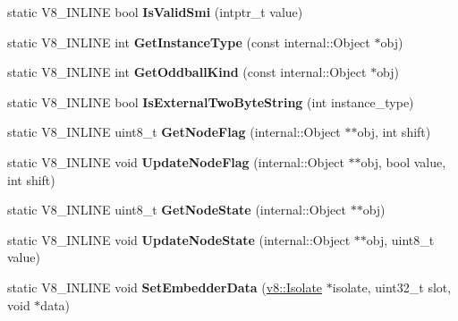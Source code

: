 \begin{DoxyCompactItemize}
static V8\+\_\+\+I\+N\+L\+I\+NE bool {\bfseries Is\+Valid\+Smi} (intptr\+\_\+t value)
\item 
\mbox{\label{classv8_1_1internal_1_1Internals_a38c4f83c21a6e6620b515e569900afaa}} 
static V8\+\_\+\+I\+N\+L\+I\+NE int {\bfseries Get\+Instance\+Type} (const internal\+::\+Object $\ast$obj)
\item 
\mbox{\label{classv8_1_1internal_1_1Internals_a815059bbe1e7f23df55afed06d591b9a}} 
static V8\+\_\+\+I\+N\+L\+I\+NE int {\bfseries Get\+Oddball\+Kind} (const internal\+::\+Object $\ast$obj)
\item 
\mbox{\label{classv8_1_1internal_1_1Internals_afbf930e9dfde745b54e1e7e03b5b96c8}} 
static V8\+\_\+\+I\+N\+L\+I\+NE bool {\bfseries Is\+External\+Two\+Byte\+String} (int instance\+\_\+type)
\item 
\mbox{\label{classv8_1_1internal_1_1Internals_aa7df51a3da3e021e2bd4426461e6d1fb}} 
static V8\+\_\+\+I\+N\+L\+I\+NE uint8\+\_\+t {\bfseries Get\+Node\+Flag} (internal\+::\+Object $\ast$$\ast$obj, int shift)
\item 
\mbox{\label{classv8_1_1internal_1_1Internals_a868ffed15d660ac6959597e45a353d6e}} 
static V8\+\_\+\+I\+N\+L\+I\+NE void {\bfseries Update\+Node\+Flag} (internal\+::\+Object $\ast$$\ast$obj, bool value, int shift)
\item 
\mbox{\label{classv8_1_1internal_1_1Internals_a76c388eb1d813144512b0af2d1c5ac7b}} 
static V8\+\_\+\+I\+N\+L\+I\+NE uint8\+\_\+t {\bfseries Get\+Node\+State} (internal\+::\+Object $\ast$$\ast$obj)
\item 
\mbox{\label{classv8_1_1internal_1_1Internals_a0f37a58646403a6a39f925006a98a0d0}} 
static V8\+\_\+\+I\+N\+L\+I\+NE void {\bfseries Update\+Node\+State} (internal\+::\+Object $\ast$$\ast$obj, uint8\+\_\+t value)
\item 
\mbox{\label{classv8_1_1internal_1_1Internals_abe73d79832edf012f30a94ccc4b293d2}} 
static V8\+\_\+\+I\+N\+L\+I\+NE void {\bfseries Set\+Embedder\+Data} (\mbox{\hyperlink{classv8_1_1Isolate}{v8\+::\+Isolate}} $\ast$isolate, uint32\+\_\+t slot, void $\ast$data)

\end{DoxyCompactItemize}
